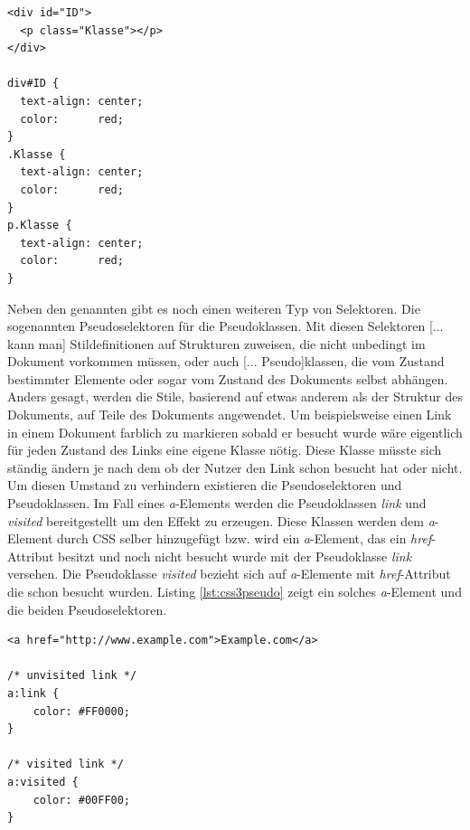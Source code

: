 \documentclass[12pt,a4paper,bibliography=totocnumbered,listof=totocnumbered]{scrartcl}
\begin{document}
	\vspace{1em}
	\begin{lstlisting}[caption=CSS3 Klassen- und ID-Selektoren, label=lst:css3idclass]
<div id="ID">
  <p class="Klasse"></p>
</div>

div#ID {
  text-align: center;
  color:      red;
}
.Klasse {
  text-align: center;
  color:      red;
}
p.Klasse {
  text-align: center;
  color:      red;
}
	\end{lstlisting}
	
Neben den genannten gibt es noch einen weiteren Typ von Selektoren. Die sogenannten Pseudoselektoren für die Pseudoklassen. \glqq Mit diesen Selektoren [... kann man] Stildefinitionen auf Strukturen zuweisen, die nicht unbedingt im Dokument vorkommen müssen, oder auch [... Pseudo]klassen, die vom Zustand bestimmter Elemente oder sogar vom Zustand des Dokuments selbst abhängen. Anders gesagt, werden die Stile, basierend auf etwas anderem als der Struktur des Dokuments, auf Teile des Dokuments angewendet.\grqq{}\cite[S.53ff]{MeyeCasc2005} Um beispielsweise einen Link in einem Dokument farblich zu markieren sobald er besucht wurde wäre eigentlich für jeden Zustand des Links eine eigene Klasse nötig. Diese Klasse müsste sich ständig ändern je nach dem ob der Nutzer den Link schon besucht hat oder nicht. Um diesen Umstand zu verhindern existieren die Pseudoselektoren und Pseudoklassen. Im Fall eines \textit{a}-Elements werden die Pseudoklassen \textit{link} und \textit{visited} bereitgestellt um den Effekt zu erzeugen. Diese Klassen werden dem \textit{a}-Element durch CSS selber hinzugefügt bzw. wird ein \textit{a}-Element, das ein \textit{href}-Attribut besitzt und noch nicht besucht wurde mit der Pseudoklasse \textit{link} versehen. Die Pseudoklasse \textit{visited} bezieht sich auf \textit{a}-Elemente mit \textit{href}-Attribut die schon besucht wurden. Listing \ref{lst:css3pseudo} zeigt ein solches \textit{a}-Element und die beiden Pseudoselektoren.

	\vspace{1em}
	\begin{lstlisting}[caption=CSS3 Pseudoklassen und -selektoren, label=lst:css3pseudo]
<a href="http://www.example.com">Example.com</a>

/* unvisited link */
a:link {
    color: #FF0000;
}

/* visited link */
a:visited {
    color: #00FF00;
}
	\end{lstlisting}
\end{document}
